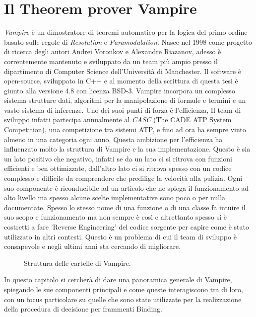 \documentclass[./main.tex]{subfiles}
\begin{document}
\chapter{Il Theorem prover Vampire} \label{chap:vampire}
\textit{Vampire} \cite{vampire1} \cite{vampire2} \cite{vampireWebsite} è un dimostratore di teoremi automatico
per la logica del primo ordine basato sulle regole di \textit{Resolution} e \textit{Paramodulation}.
Nasce nel 1998 come progetto di ricerca degli autori Andrei Voronkov e Alexandre Riazanov,
adesso è correntemente mantenuto e sviluppato da un team più ampio presso il dipartimento di Computer Science dell'Università di Manchester. 
Il software è open-source, sviluppato in C++ e al momento della scrittura di questa tesi è giunto alla versione 4.8 con licenza BSD-3.
Vampire incorpora un complesso sistema strutture dati, algoritmi per la manipolazione di formule e termini e un vasto sistema di inferenze.
Uno dei suoi punti di forza è l'efficienza, Il team di sviluppo infatti partecipa annualmente al \textit{CASC} (The CADE ATP System Competition),
una competizione tra sistemi ATP, e fino ad ora ha sempre vinto almeno in una categoria ogni anno.
Questa ambizione per l'efficienza ha influenzato molto la struttura di Vampire e la sua implementazione.
Questo è sia un lato positivo che negativo, infatti se da un lato ci si ritrova con funzioni efficienti e ben ottimizzate,
dall'altro lato ci si ritrova spesso con un codice complesso e difficile da comprendere che predilige la velocità alla pulizia.
Ogni suo componente è riconducibile ad un articolo che ne spiega il funzionamento ad alto livello ma spesso
alcune scelte implementative sono poco o per nulla documentate. 
Spesso lo stesso nome di una funzione o di una classe fa intuire il suo scopo e funzionamento ma 
non sempre è così e altrettanto spesso si è costretti a fare 'Reverse Engineering' del codice sorgente per capire come è stato utilizzato in altri contesti.
Questo è un problema di cui il team di sviluppo è consapevole e negli ultimi anni sta cercando di migliorare.
\begin{figure}[ht]
    \centering
    
    \caption{Struttura delle cartelle di Vampire.}
    \label{fig:vampire_cartelle}
\end{figure}
In questo capitolo si cercherà di dare una panoramica generale di Vampire, spiegando le sue componenti principali e come queste interagiscono tra di loro,
con un focus particolare su quelle che sono state utilizzate per la realizzazione della procedura di decisione per frammenti Binding.
\end{document}

